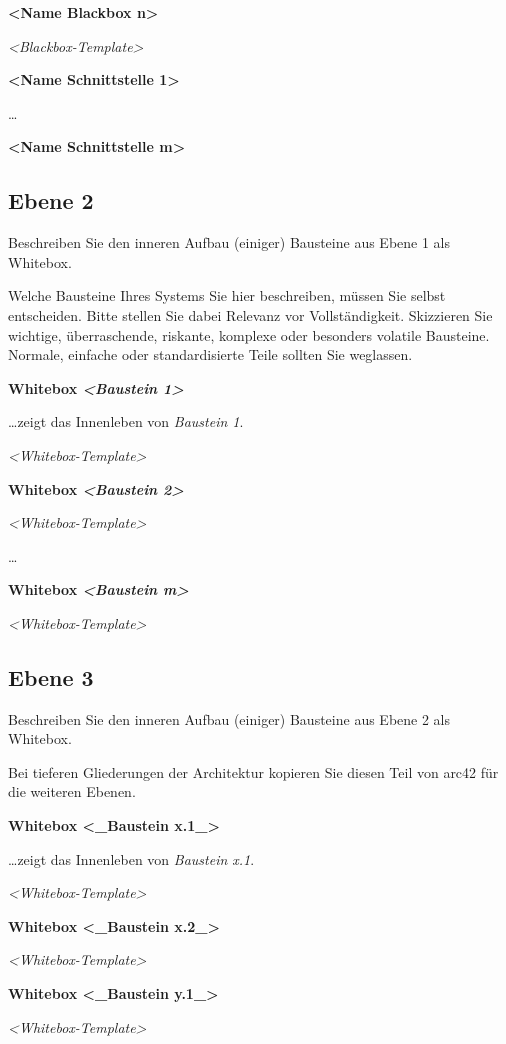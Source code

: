 \textbf{\textless Name Blackbox n\textgreater{}}

\emph{\textless Blackbox-Template\textgreater{}}

\textbf{\textless Name Schnittstelle 1\textgreater{}}

\ldots{}

\textbf{\textless Name Schnittstelle m\textgreater{}}

\hypertarget{ebene-2}{%
\subsection{Ebene 2}\label{ebene-2}}

Beschreiben Sie den inneren Aufbau (einiger) Bausteine aus Ebene 1 als
Whitebox.

Welche Bausteine Ihres Systems Sie hier beschreiben, müssen Sie selbst
entscheiden. Bitte stellen Sie dabei Relevanz vor Vollständigkeit.
Skizzieren Sie wichtige, überraschende, riskante, komplexe oder
besonders volatile Bausteine. Normale, einfache oder standardisierte
Teile sollten Sie weglassen.

\textbf{Whitebox \emph{\textless Baustein 1\textgreater{}}}

\ldots zeigt das Innenleben von \emph{Baustein 1}.

\emph{\textless Whitebox-Template\textgreater{}}

\textbf{Whitebox \emph{\textless Baustein 2\textgreater{}}}

\emph{\textless Whitebox-Template\textgreater{}}

\ldots{}

\textbf{Whitebox \emph{\textless Baustein m\textgreater{}}}

\emph{\textless Whitebox-Template\textgreater{}}

\hypertarget{ebene-3}{%
\subsection{Ebene 3}\label{ebene-3}}

Beschreiben Sie den inneren Aufbau (einiger) Bausteine aus Ebene 2 als
Whitebox.

Bei tieferen Gliederungen der Architektur kopieren Sie diesen Teil von
arc42 für die weiteren Ebenen.

\textbf{Whitebox \textless\_Baustein x.1\_\textgreater{}}

\ldots zeigt das Innenleben von \emph{Baustein x.1}.

\emph{\textless Whitebox-Template\textgreater{}}

\textbf{Whitebox \textless\_Baustein x.2\_\textgreater{}}

\emph{\textless Whitebox-Template\textgreater{}}

\textbf{Whitebox \textless\_Baustein y.1\_\textgreater{}}

\emph{\textless Whitebox-Template\textgreater{}}
